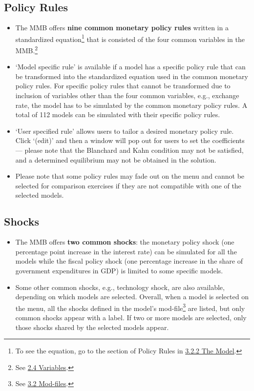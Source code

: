 \documentclass[10pt,a4paper]{article}
\begin{document}
\subsection{Policy Rules}
\label{sec:Rules}
\medskip

\begin{itemize}
\item The MMB offers \textbf{nine common monetary policy rules} written in a standardized equation\footnote{To see the equation, go to the section of Policy Rules in \hyperref[sec:Model]{3.2.2 The Model}.} that is consisted of the four common variables in the MMB.\footnote{See \hyperref[sec:Var]{2.4 Variables}.}

\item ‘Model specific rule’ is available if a model has a specific policy rule that can be transformed into the standardized equation used in the common monetary policy rules. For specific policy rules that cannot be transformed due to inclusion of variables other than the four common variables, e.g., exchange rate, the model has to be simulated by the common monetary policy rules. A total of 112 models can be simulated with their specific policy rules.

\item ‘User specified rule’ allows users to tailor a desired monetary policy rule. Click ‘(edit)’ and then a window will pop out for users to set the coefficients — please note that the Blanchard and Kahn condition may not be satisfied, and a determined equilibrium may not be obtained in the solution. 

\item Please note that some policy rules may fade out on the menu and cannot be selected for comparison exercises if they are not compatible with one of the selected models.
\end{itemize}

\subsection{Shocks}
\label{sec:Shocks}
\medskip

\begin{itemize}
\item The MMB offers \textbf{two common shocks}: the monetary policy shock (one percentage point increase in the interest rate) can be simulated for all the models while the fiscal policy shock (one percentage increase in the share of government expenditures in GDP) is limited to some specific models. 

\item Some other common shocks, e.g., technology shock, are also available, depending on which models are selected. Overall, when a model is selected on the menu, all the shocks defined in the model’s mod-file\footnote{See \hyperref[sec:Mod]{3.2 Mod-files}.} are listed, but only common shocks appear with a label. If two or more models are selected, only those shocks shared by the selected models appear.
\end{itemize}
\end{document}
